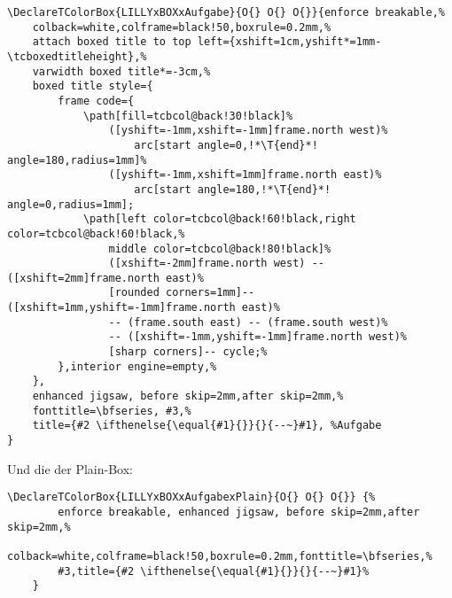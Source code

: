 {\scriptsize\begin{lstlisting}[style=latex]
\DeclareTColorBox{LILLYxBOXxAufgabe}{O{} O{} O{}}{enforce breakable,%
    colback=white,colframe=black!50,boxrule=0.2mm,%
    attach boxed title to top left={xshift=1cm,yshift*=1mm-\tcboxedtitleheight},%
    varwidth boxed title*=-3cm,%
    boxed title style={
        frame code={
            \path[fill=tcbcol@back!30!black]%
                ([yshift=-1mm,xshift=-1mm]frame.north west)%
                    arc[start angle=0,!*\T{end}*! angle=180,radius=1mm]%
                ([yshift=-1mm,xshift=1mm]frame.north east)%
                    arc[start angle=180,!*\T{end}*! angle=0,radius=1mm];
            \path[left color=tcbcol@back!60!black,right color=tcbcol@back!60!black,%
                middle color=tcbcol@back!80!black]%
                ([xshift=-2mm]frame.north west) -- ([xshift=2mm]frame.north east)%
                [rounded corners=1mm]-- ([xshift=1mm,yshift=-1mm]frame.north east)%
                -- (frame.south east) -- (frame.south west)%
                -- ([xshift=-1mm,yshift=-1mm]frame.north west)%
                [sharp corners]-- cycle;%
        },interior engine=empty,%
    },
    enhanced jigsaw, before skip=2mm,after skip=2mm,%
    fonttitle=\bfseries, #3,%
    title={#2 \ifthenelse{\equal{#1}{}}{}{--~}#1}, %Aufgabe
}
\end{lstlisting}}
Und die der Plain-Box:
{\scriptsize\begin{lstlisting}[style=latex]
\DeclareTColorBox{LILLYxBOXxAufgabexPlain}{O{} O{} O{}} {%
        enforce breakable, enhanced jigsaw, before skip=2mm,after skip=2mm,%
        colback=white,colframe=black!50,boxrule=0.2mm,fonttitle=\bfseries,%
        #3,title={#2 \ifthenelse{\equal{#1}{}}{}{--~}#1}%
    }
\end{lstlisting}}